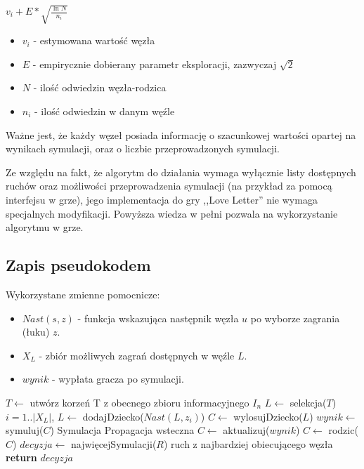 \begin{center}
	${v_i} + E*\sqrt{\frac{\ln{N}}{n_i}}$
\end{center}
\begin{itemize}
	\item $v_i$ - estymowana wartość węzła
	\item $E$ - empirycznie dobierany parametr eksploracji, zazwyczaj $\sqrt{2}$
	\item $N$ - ilość odwiedzin węzła-rodzica
	\item $n_i$ - ilość odwiedzin w danym węźle
\end{itemize}
Ważne jest, że każdy węzeł posiada informację o szacunkowej wartości opartej na wynikach symulacji, oraz o liczbie przeprowadzonych symulacji.

Ze względu na fakt, że algorytm do działania wymaga wyłącznie listy dostępnych ruchów oraz możliwości przeprowadzenia symulacji (na przykład za pomocą interfejsu w grze), jego implementacja do gry ,,Love Letter'' nie wymaga specjalnych modyfikacji. Powyższa wiedza w pełni pozwala na wykorzystanie algorytmu w grze.
\subsection{Zapis pseudokodem}
Wykorzystane zmienne pomocnicze:
\begin{itemize}
	\item $Nast(s, z)$ - funkcja wskazująca następnik węzła $u$ po wyborze zagrania (łuku) $z$.
	\item $X_L$ - zbiór możliwych zagrań dostępnych w węźle $L$.
	\item $wynik$ - wypłata gracza po symulacji.
\end{itemize}
\begin{algorithmic}[1]
		\State $T \gets $ utwórz korzeń T z obecnego zbioru informacyjnego $I_n$
		\Repeat
			\State $L \gets $ selekcja($T$)
				 \Comment $i=1..|X_L|$, 
					\State $L \gets$ dodajDziecko($Nast(L, z_i)$)
				\EndFor
				\State $C \gets$ wylosujDziecko($L$)
				\State $wynik \gets$ symuluj($C$)	\Comment Symulacja
				\Repeat	\Comment Propagacja wsteczna
					\State $C \gets $ aktualizuj($wynik$)
					\State $C \gets $ rodzic($C$)
			\EndIf 
		\State $decyzja \gets$ najwięcejSymulacji($R$) \Comment ruch z najbardziej obiecującego węzła 
		\State \textbf{return} $decyzja$
	\EndFunction
\end{algorithmic}